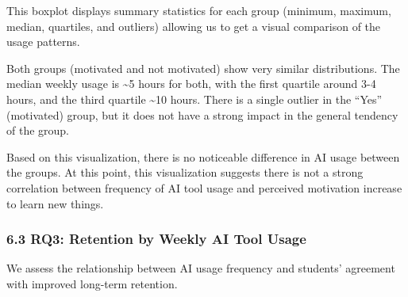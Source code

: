 \documentclass[
]{article}
\begin{document}
This boxplot displays summary statistics for each group (minimum,
maximum, median, quartiles, and outliers) allowing us to get a visual
comparison of the usage patterns.

Both groups (motivated and not motivated) show very similar
distributions. The median weekly usage is \textasciitilde5 hours for
both, with the first quartile around 3-4 hours, and the third quartile
\textasciitilde10 hours. There is a single outlier in the ``Yes''
(motivated) group, but it does not have a strong impact in the general
tendency of the group.

Based on this visualization, there is no noticeable difference in AI
usage between the groups. At this point, this visualization suggests
there is not a strong correlation between frequency of AI tool usage and
perceived motivation increase to learn new things.

\subsubsection{6.3 RQ3: Retention by Weekly AI Tool
Usage}\label{rq3-retention-by-weekly-ai-tool-usage}

We assess the relationship between AI usage frequency and students'
agreement with improved long-term retention.
\end{document}

